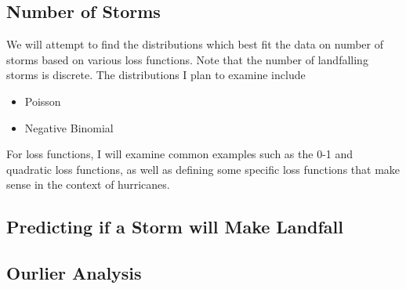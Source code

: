 
\subsection{Number of Storms}

\par
We will attempt to find the distributions which best fit the data on number of storms based on various loss functions.
Note that the number of landfalling storms is discrete.
The distributions I plan to examine include
\begin{itemize}
	\item Poisson
	\item Negative Binomial
\end{itemize}
For loss functions, I will examine common examples such as the 0-1 and quadratic loss functions, as well as defining some specific loss functions that make sense in the context of hurricanes.

\subsection{Predicting if a Storm will Make Landfall}

\subsection{Ourlier Analysis}
